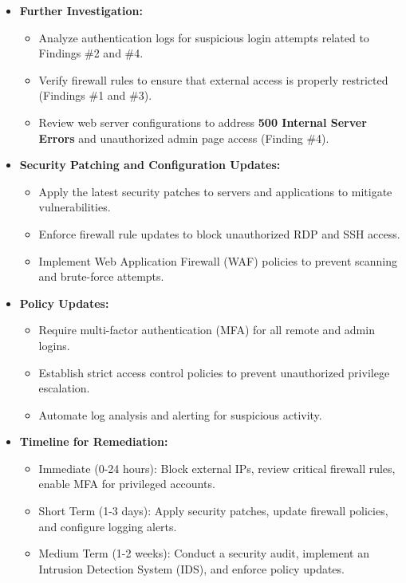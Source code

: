 \documentclass[11pt]{article}
\begin{document}
\begin{itemize}
    \item \textbf{Further Investigation:} 
    \begin{itemize}
        \item Analyze authentication logs for suspicious login attempts related to Findings \#2 and \#4.
        \item Verify firewall rules to ensure that external access is properly restricted (Findings \#1 and \#3).
        \item Review web server configurations to address \textbf{500 Internal Server Errors} and unauthorized admin page access (Finding \#4).
    \end{itemize}
    
    \item \textbf{Security Patching and Configuration Updates:}
    \begin{itemize}
        \item Apply the latest security patches to servers and applications to mitigate vulnerabilities.
        \item Enforce firewall rule updates to block unauthorized RDP and SSH access.
        \item Implement Web Application Firewall (WAF) policies to prevent scanning and brute-force attempts.
    \end{itemize}
    
    \item \textbf{Policy Updates:}
    \begin{itemize}
        \item Require multi-factor authentication (MFA) for all remote and admin logins.
        \item Establish strict access control policies to prevent unauthorized privilege escalation.
        \item Automate log analysis and alerting for suspicious activity.
    \end{itemize}

    \item \textbf{Timeline for Remediation:}
    \begin{itemize}
        \item Immediate (0-24 hours): Block external IPs, review critical firewall rules, enable MFA for privileged accounts.
        \item Short Term (1-3 days): Apply security patches, update firewall policies, and configure logging alerts.
        \item Medium Term (1-2 weeks): Conduct a security audit, implement an Intrusion Detection System (IDS), and enforce policy updates.
    \end{itemize}


\end{itemize}
\end{document}
